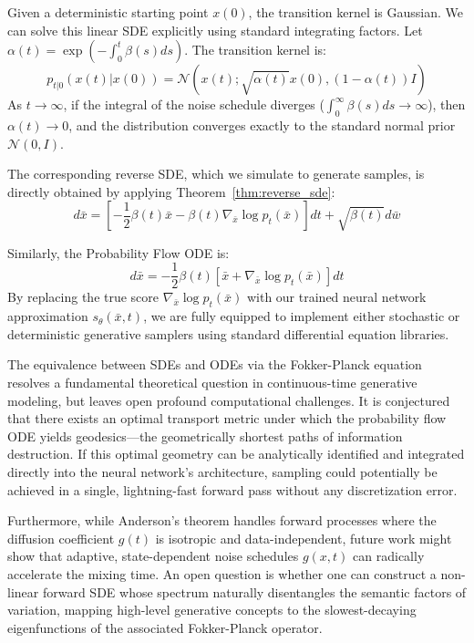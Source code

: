 Given a deterministic starting point $x(0)$, the transition kernel is Gaussian. We can solve this linear SDE explicitly using standard integrating factors. Let $\alpha(t) = \exp\left(-\int_0^t \beta(s) ds\right)$. The transition kernel is:
\begin{equation}
p_{t|0}(x(t) | x(0)) = \mathcal{N}\left(x(t); \sqrt{\alpha(t)} x(0), (1 - \alpha(t)) I \right)
\end{equation}
As $t \to \infty$, if the integral of the noise schedule diverges ($\int_0^\infty \beta(s) ds \to \infty$), then $\alpha(t) \to 0$, and the distribution converges exactly to the standard normal prior $\mathcal{N}(0, I)$.

The corresponding reverse SDE, which we simulate to generate samples, is directly obtained by applying Theorem~\ref{thm:reverse_sde}:
\begin{equation}
d\bar{x} = \left[ -\frac{1}{2} \beta(t) \bar{x} - \beta(t) \nabla_{\bar{x}} \log p_t(\bar{x}) \right] dt + \sqrt{\beta(t)} d\bar{w}
\end{equation}

Similarly, the Probability Flow ODE is:
\begin{equation}
d\bar{x} = -\frac{1}{2} \beta(t) \left[ \bar{x} + \nabla_{\bar{x}} \log p_t(\bar{x}) \right] dt
\end{equation}
By replacing the true score $\nabla_{\bar{x}} \log p_t(\bar{x})$ with our trained neural network approximation $s_\theta(\bar{x}, t)$, we are fully equipped to implement either stochastic or deterministic generative samplers using standard differential equation libraries.


\begin{horizon}
The equivalence between SDEs and ODEs via the Fokker-Planck equation resolves a fundamental theoretical question in continuous-time generative modeling, but leaves open profound computational challenges. It is conjectured that there exists an optimal transport metric under which the probability flow ODE yields geodesics---the geometrically shortest paths of information destruction. If this optimal geometry can be analytically identified and integrated directly into the neural network's architecture, sampling could potentially be achieved in a single, lightning-fast forward pass without any discretization error.

Furthermore, while Anderson's theorem handles forward processes where the diffusion coefficient $g(t)$ is isotropic and data-independent, future work might show that adaptive, state-dependent noise schedules $g(x, t)$ can radically accelerate the mixing time. An open question is whether one can construct a non-linear forward SDE whose spectrum naturally disentangles the semantic factors of variation, mapping high-level generative concepts to the slowest-decaying eigenfunctions of the associated Fokker-Planck operator. 
\end{horizon}


